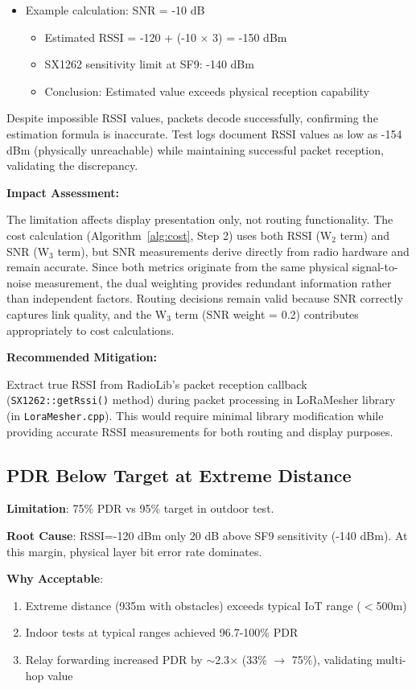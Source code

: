 \begin{itemize}
\item Example calculation: SNR = -10 dB
  \begin{itemize}
  \item Estimated RSSI = -120 + (-10 $\times$ 3) = -150 dBm
  \item SX1262 sensitivity limit at SF9: -140 dBm
  \item Conclusion: Estimated value exceeds physical reception capability
  \end{itemize}
\end{itemize}

Despite impossible RSSI values, packets decode successfully, confirming the estimation formula is inaccurate. Test logs document RSSI values as low as -154 dBm (physically unreachable) while maintaining successful packet reception, validating the discrepancy.

\textbf{Impact Assessment:}

The limitation affects display presentation only, not routing functionality. The cost calculation (Algorithm~\ref{alg:cost}, Step 2) uses both RSSI (W$_2$ term) and SNR (W$_3$ term), but SNR measurements derive directly from radio hardware and remain accurate. Since both metrics originate from the same physical signal-to-noise measurement, the dual weighting provides redundant information rather than independent factors. Routing decisions remain valid because SNR correctly captures link quality, and the W$_3$ term (SNR weight = 0.2) contributes appropriately to cost calculations.

\textbf{Recommended Mitigation:}

Extract true RSSI from RadioLib's packet reception callback (\texttt{SX1262::getRssi()} method) during packet processing in LoRaMesher library (in \texttt{LoraMesher.cpp}). This would require minimal library modification while providing accurate RSSI measurements for both routing and display purposes.

\subsection{PDR Below Target at Extreme Distance}

\textbf{Limitation}: 75\% PDR vs 95\% target in outdoor test.

\textbf{Root Cause}: RSSI=-120 dBm only 20 dB above SF9 sensitivity (-140 dBm). At this margin, physical layer bit error rate dominates.

\textbf{Why Acceptable}:
\begin{enumerate}
\item Extreme distance (935m with obstacles) exceeds typical IoT range ($<$500m)
\item Indoor tests at typical ranges achieved 96.7-100\% PDR
\item Relay forwarding increased PDR by $\sim$2.3$\times$ (33\% $\rightarrow$ 75\%), validating multi-hop value
\end{enumerate}

